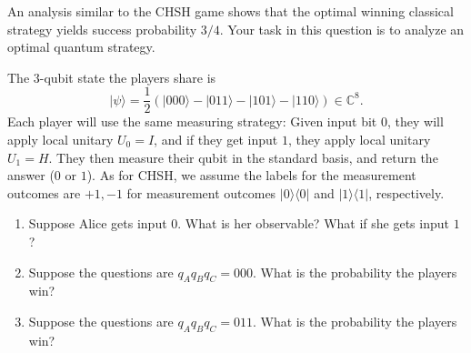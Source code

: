 \documentclass{article}
\newcommand{\bra}[1]{\langle #1|}
\newcommand{\ket}[1]{|#1\rangle}
\newcommand{\ketbra}[2]{\ket{#1}{\bra{#2}}}
\newcommand{\complex}{{\mathbb C}}
\begin{document}
\begin{enumerate}
        An analysis similar to the CHSH game shows that the optimal winning classical strategy yields success probability $3/4$. Your task in this question is to analyze an optimal quantum strategy.

        The $3$-qubit state the players share is
        \[
            \ket{\psi}=\frac{1}{2}\left(\ket{000}-\ket{011}-\ket{101}-\ket{110}\right)\in\complex^8.
        \]
        Each player will use the same measuring strategy: Given input bit $0$, they will apply local unitary $U_0=I$, and if they get input $1$, they apply local unitary $U_1=H$. They then measure their qubit in the standard basis, and return the answer ($0$ or $1$). As for CHSH, we assume the labels for the measurement outcomes are $+1,-1$ for measurement outcomes $\ketbra{0}{0}$ and $\ketbra{1}{1}$, respectively.
        \begin{enumerate}
            \item Suppose Alice gets input $0$. What is her observable? What if she gets input $1$?
            \item Suppose the questions are $q_Aq_Bq_C=000$. What is the probability the players win?
            \item Suppose the questions are $q_Aq_Bq_C=011$. What is the probability the players win?
        \end{enumerate}
\end{enumerate}
\end{document}
